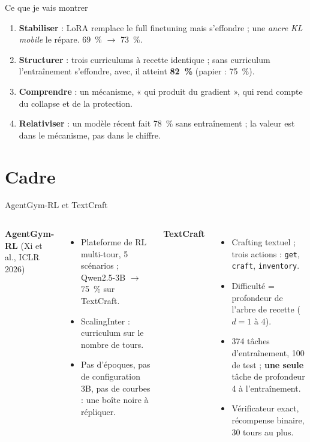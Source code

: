 \documentclass[aspectratio=169,11pt]{beamer}
\begin{document}
\begin{frame}{Ce que je vais montrer}
\begin{enumerate}
    \item \textbf{Stabiliser} : LoRA remplace le full finetuning mais s'effondre ; une \emph{ancre KL mobile} le répare. 69~\% $\to$ 73~\%.
    \item \textbf{Structurer} : trois curriculums à recette identique ; sans curriculum l'entraînement s'effondre, avec, il atteint \textbf{82~\%} (papier : 75~\%).
    \item \textbf{Comprendre} : un mécanisme, « qui produit du gradient », qui rend compte du collapse et de la protection.
    \item \textbf{Relativiser} : un modèle récent fait 78~\% sans entraînement ; la valeur est dans le mécanisme, pas dans le chiffre.
\end{enumerate}
\end{frame}

\section{Cadre}

\begin{frame}{AgentGym-RL et TextCraft}
\begin{columns}[T]
\textbf{AgentGym-RL} (Xi et al., ICLR 2026)
\begin{itemize}
    \item Plateforme de RL multi-tour, 5 scénarios ; Qwen2.5-3B $\to$ 75~\% sur TextCraft.
    \item ScalingInter : curriculum sur le nombre de tours.
    \item Pas d'époques, pas de configuration 3B, pas de courbes : une boîte noire à répliquer.
\end{itemize}
\textbf{TextCraft}
\begin{itemize}
    \item Crafting textuel ; trois actions : \texttt{get}, \texttt{craft}, \texttt{inventory}.
    \item Difficulté = profondeur de l'arbre de recette ($d = 1$ à $4$).
    \item 374 tâches d'entraînement, 100 de test ; \textbf{une seule} tâche de profondeur 4 à l'entraînement.
    \item Vérificateur exact, récompense binaire, 30 tours au plus.
\end{itemize}
\end{columns}
\end{frame}
\end{document}
